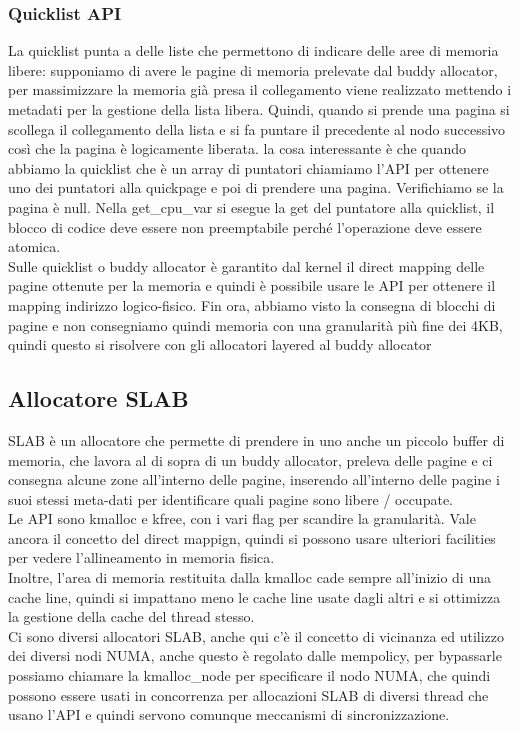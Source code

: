 \documentclass[12pt, oneside]{extbook}
\begin{document}
\subsubsection{Quicklist API}
La quicklist punta a delle liste che permettono di indicare delle aree di memoria libere: supponiamo di avere le pagine di memoria prelevate dal buddy allocator, per massimizzare la memoria già presa il collegamento viene realizzato mettendo i metadati per la gestione della lista libera. Quindi, quando si prende una pagina si scollega il collegamento della lista e si fa puntare il precedente al nodo successivo così che la pagina è logicamente liberata.
la cosa interessante è che quando abbiamo la quicklist che è un array di puntatori chiamiamo l'API per ottenere uno dei puntatori alla quickpage e poi di prendere una pagina. Verifichiamo se la pagina è null. Nella \textsf{get\_cpu\_var} si esegue la get del puntatore alla quicklist, il blocco di codice deve essere non preemptabile perché l'operazione deve essere atomica.\\Sulle quicklist o buddy allocator è garantito dal kernel il direct mapping delle pagine ottenute per la memoria e quindi è possibile usare le API per ottenere il mapping indirizzo logico-fisico. Fin ora, abbiamo visto la consegna di blocchi di pagine e non consegniamo quindi memoria con una granularità più fine dei 4KB, quindi questo si risolvere con gli allocatori layered al buddy allocator
\subsection{Allocatore SLAB}
SLAB è un allocatore che permette di prendere in uno anche un piccolo buffer di memoria, che lavora al di sopra di un buddy allocator, preleva delle pagine e ci consegna alcune zone all'interno delle pagine, inserendo all'interno delle pagine i suoi stessi meta-dati per identificare quali pagine sono libere / occupate.\\ Le API sono \textsf{kmalloc} e \textsf{kfree}, con i vari flag per scandire la granularità. Vale ancora il concetto del direct mappign, quindi si possono usare ulteriori facilities per vedere l'allineamento in memoria fisica.\\ Inoltre, l'area di memoria restituita dalla kmalloc cade sempre all'inizio di una cache line, quindi si impattano meno le cache line usate dagli altri e si ottimizza la gestione della cache del thread stesso.\\Ci sono diversi allocatori SLAB, anche qui c'è il concetto di vicinanza ed utilizzo dei diversi nodi NUMA, anche questo è regolato dalle mempolicy, per bypassarle possiamo chiamare la \textsf{kmalloc\_node} per specificare il nodo NUMA, che quindi possono essere usati in concorrenza per allocazioni SLAB di diversi thread che usano l'API e quindi servono comunque meccanismi di sincronizzazione.
\end{document}
